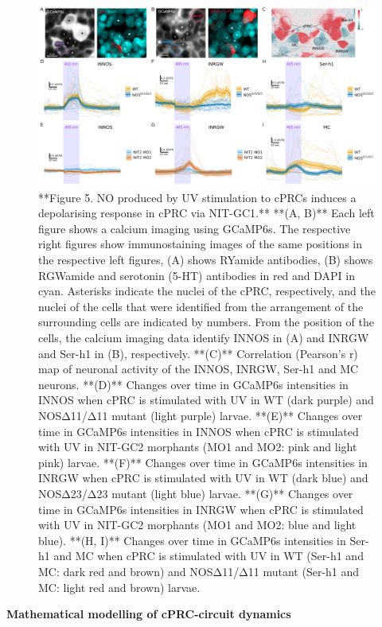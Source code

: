 \documentclass[
  10pt,
  onecolumn]{article}
\begin{document}
\begin{figure}
\includegraphics[width=52.08in]{figures/Fig5} \caption{**Figure 5. NO produced by UV stimulation to cPRCs induces a depolarising response in cPRC via NIT-GC1.** **(A, B)** Each left figure shows a calcium imaging using GCaMP6s. The respective right figures show immunostaining images of the same positions in the respective left figures, (A) shows RYamide antibodies, (B) shows RGWamide and serotonin (5-HT) antibodies in red and DAPI in cyan. Asterisks indicate the nuclei of the cPRC, respectively, and the nuclei of the cells that were identified from the arrangement of the surrounding cells are indicated by numbers. From the position of the cells, the calcium imaging data identify INNOS in (A) and INRGW and Ser-h1 in (B), respectively. **(C)** Correlation (Pearson's r) map of neuronal activity of the INNOS, INRGW, Ser-h1 and MC neurons. **(D)** Changes over time in GCaMP6s intensities in INNOS when cPRC is stimulated with UV in WT (dark purple) and NOSΔ11/Δ11 mutant (light purple) larvae. **(E)** Changes over time in GCaMP6s intensities in INNOS when cPRC is stimulated with UV in NIT-GC2 morphants (MO1 and MO2: pink and light pink) larvae. **(F)** Changes over time in GCaMP6s intensities in INRGW when cPRC is stimulated with UV in WT (dark blue) and NOSΔ23/Δ23 mutant (light blue) larvae. **(G)** Changes over time in GCaMP6s intensities in INRGW when cPRC is stimulated with UV in NIT-GC2 morphants (MO1 and MO2: blue and light blue). **(H, I)** Changes over time in GCaMP6s intensities in Ser-h1 and MC when cPRC is stimulated with UV in WT (Ser-h1 and MC: dark red and brown) and NOSΔ11/Δ11 mutant (Ser-h1 and MC: light red and brown) larvae.}\label{fig:unnamed-chunk-5}
\end{figure}

\textbf{Mathematical modelling of cPRC-circuit dynamics}
\end{document}
